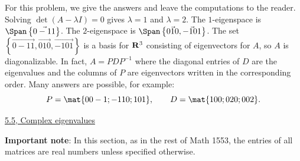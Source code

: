 \begin{problems}
\begin{solution}
  For this problem, we give the answers and leave the computations to the
  reader. \newline \newline %
  Solving $\det(A-\lambda I) = 0$ gives $\lambda = 1$ and $\lambda = 2$.
  \newline \newline %
  The $1$-eigenspace is $\Span\left\{\vec{0 -1 1}\right\}$. \newline %
  The $2$-eigenspace is %
  $\Span\left\{\vec{0 1 0}, \vec{-1 0 1}\right\}$. \newline %
  The set $\left\{\vec{0 -1 1}, \vec{0 1 0}, \vec{-1 0 1} \right\}$ is a basis
  for ${\bf R}^{3}$ consisting of eigenvectors for $A$, so $A$ is
  diagonalizable.  In fact, $A = PDP^{-1}$ where the diagonal entries of $D$ are
  the eigenvalues and the columns of $P$ are eigenvectors written in the
  corresponding order.  Many answers are possible, for example:
    \[P = \mat{0 0 -1; -1 1 0; 1 0 1}, \qquad D = \mat{1 0 0; 0 2 0; 0 0 2}.\]
\end{solution}


 
\end{problems}\setcounter{problem}{0}

\newpage

\begin{center} \underline{5.5, Complex eigenvalues} \end{center}

{\bf Important note}: In this section, as in the rest of Math 1553, the entries
of all matrices are real numbers unless specified otherwise.

